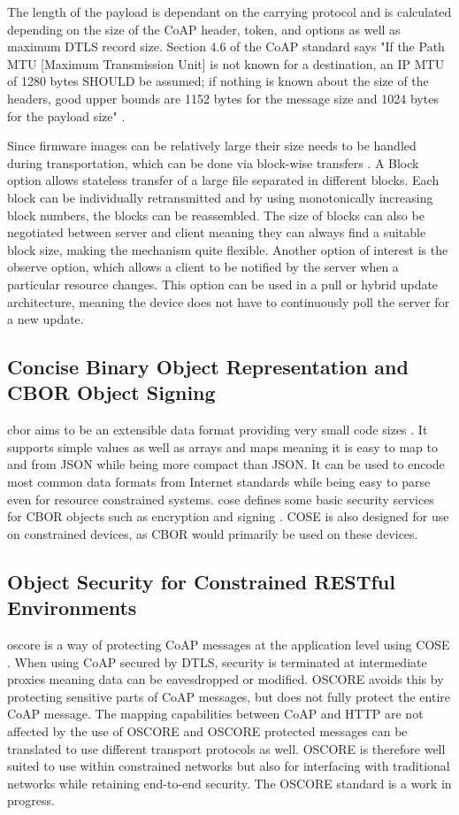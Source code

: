 \documentclass[0-thesis.tex]{subfiles}
\begin{document}
The length of the payload is dependant on the carrying protocol and is calculated
depending on the size of the CoAP header, token, and options as well as maximum DTLS
record size. Section 4.6 of the CoAP standard says "If the Path MTU [Maximum Transmission
Unit] is not known for a destination, an IP MTU of 1280 bytes SHOULD be assumed; if
nothing is known about the size of the headers, good upper bounds are 1152 bytes for the
message size and 1024 bytes for the payload size" \parencite{rfc7252}.

Since firmware images can be relatively large their size needs to be handled during
transportation, which can be done via block-wise transfers \parencite{rfc7959}. A Block
option allows stateless transfer of a large file separated in different blocks. Each block
can be individually retransmitted and by using monotonically increasing block numbers, the
blocks can be reassembled. The size of blocks can also be negotiated between server and
client meaning they can always find a suitable block size, making the mechanism quite
flexible. Another option of interest is the observe option, which allows a client to be
notified by the server when a particular resource changes. This option can be used in a
pull or hybrid update architecture, meaning the device does not have to continuously poll
the server for a new update.

\subsection{Concise Binary Object Representation and CBOR Object Signing}
\label{ssec:cbor-and-cose}
\gls{cbor} aims to be an extensible data format providing very small code sizes
\parencite{rfc7049}. It supports simple values as well as arrays and maps meaning it is
easy to map to and from JSON while being more compact than JSON. It can be used to encode
most common data formats from Internet standards while being easy to parse even for
resource constrained systems. \gls{cose} defines some basic security services for CBOR
objects such as encryption and signing \parencite{rfc8152}. COSE is also designed for use
on constrained devices, as CBOR would primarily be used on these devices.

\subsection{Object Security for Constrained RESTful Environments}
\label{ssec:oscore}
\gls{oscore} is a way of protecting CoAP messages at the application level using COSE
\parencite{oscore}. When using CoAP secured by DTLS, security is terminated at
intermediate proxies meaning data can be eavesdropped or modified. OSCORE avoids this by
protecting sensitive parts of CoAP messages, but does not fully protect the entire CoAP
message. The mapping capabilities between CoAP and HTTP are not affected by the use of
OSCORE and OSCORE protected messages can be translated to use different transport
protocols as well. OSCORE is therefore well suited to use within constrained networks but
also for interfacing with traditional networks while retaining end-to-end security. The
OSCORE standard is a work in progress.
\end{document}
